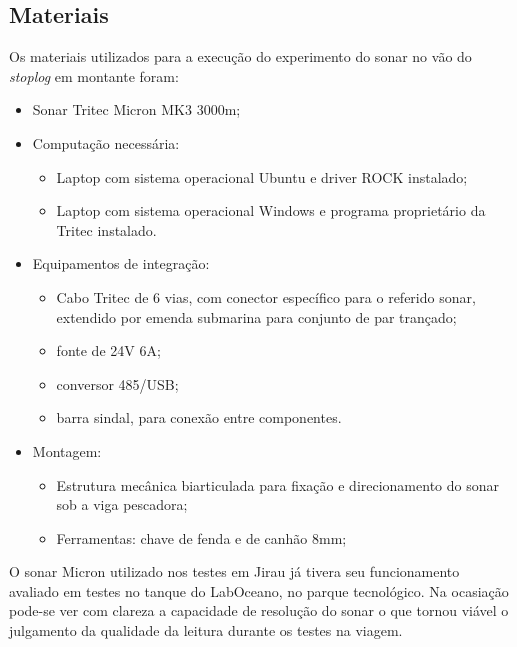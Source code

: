 


\subsection{Materiais}
\label{materials}
Os materiais utilizados para a execução do experimento do sonar no vão do
\emph{stoplog} em montante foram:
\begin{itemize}
  \item Sonar Tritec Micron MK3 3000m;
  
  \item Computação necessária:
  \begin{itemize}
    \item Laptop com sistema operacional Ubuntu e driver ROCK instalado;
    \item Laptop com sistema operacional Windows e programa proprietário da Tritec instalado.
  \end{itemize}
  
  \item Equipamentos de integração:
  \begin{itemize}
    \item Cabo Tritec de 6 vias, com conector específico para o referido sonar,
  extendido por emenda submarina para conjunto de par trançado;
    \item fonte de 24V 6A;
    \item conversor 485/USB;
    \item barra sindal, para conexão entre componentes.
  \end{itemize}
  
  \item Montagem:
  \begin{itemize}
    \item Estrutura mecânica biarticulada para fixação e direcionamento do sonar
  sob a viga pescadora;
    \item Ferramentas: chave de fenda e de canhão 8mm;
  \end{itemize}
\end{itemize}

O sonar Micron utilizado nos testes em Jirau já tivera seu funcionamento
avaliado em testes no tanque do LabOceano, no parque tecnológico. Na ocasiação
pode-se ver com clareza a capacidade de resolução do sonar o que tornou viável o
julgamento da qualidade da leitura durante os testes na viagem.

